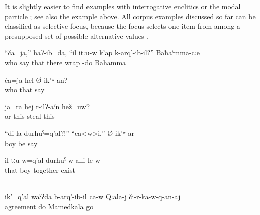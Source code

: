 It is slightly easier to find examples with interrogative enclitics  or the modal particle  ; see also the example  above. All corpus examples discussed so far can be classified as selective focus, because the focus selects one item from among a presupposed set of possible alternative values \citep[62]{Diketal1981}.
%
\begin{exe}
	\ex	\label{ex:I asked Bahama, who is it that is wrapped there}
	\gll	``ča=ja,''	haʔ-ib=da,	``il	itːu-w	k'ap	k-arq'-ib-il?'' Baħaˁmma-cːe\\
		who	say	that	there wrap	-do Bahamma\\
	\glt	{}

	\ex	\label{ex:Who is it who said this}
	\gll	ča=ja	hel	Ø-ik'ʷ-an?\\
		who	that	say\\
	\glt	{}

	\ex	\label{ex:‎‎Or is this her who is stealing}
	\gll	ja=ra	hej	r-ilʡ-aˁn	hež=uw?\\
		or	this	steal	this\\
	\glt	{}

	\ex	\label{ex:‎‎‎This is my son?!‎ ‎‎Yes, he says}
	\gll	``di-la	durħuˁ=q'al?!''	``ca<w>i,''	Ø-ik'ʷ-ar\\
			boy	be	say\\
	\glt	{}

	\ex	\label{ex:Here (i.e. on this picture) is it that the boy is together with them@26b}
	\gll	il-tːu-w=q'al	durħuˁ	w-alli	le-w\\
		that	boy	together	exist\\
	\glt	{}

	\\\label{ex:‎It was him himself who had agreed to get off (the car) in Kala (place name)}%
	\gll	ik'=q'al	waˁʡda	b-arq'-ib-il	ca-w	Qːala-j	či-r-ka-w-q-an-aj\\
			agreement	do		Mamedkala	go\\
	\glt	{}
\end{exe}

